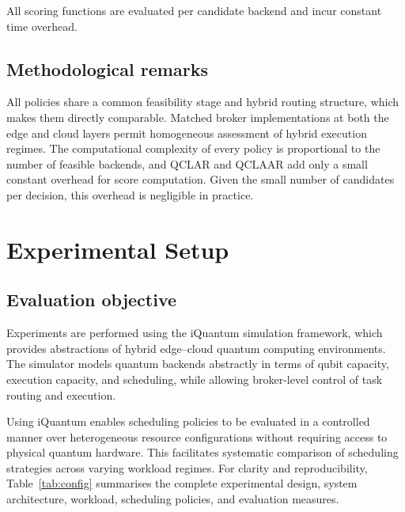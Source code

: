 \documentclass[preprint,12pt]{elsarticle}
\newcommand{\QCLAR}{\textsc{QCLAR}}
\newcommand{\QCLAAR}{\textsc{QCLAAR}}
\begin{document}
All scoring functions are evaluated per candidate backend and incur constant
time overhead.

\subsection{Methodological remarks}
All policies share a common feasibility stage and hybrid routing structure,
which makes them directly comparable. Matched broker implementations at both the
edge and cloud layers permit homogeneous assessment of hybrid execution regimes.
The computational complexity of every policy is proportional to the number of
feasible backends, and \QCLAR{} and \QCLAAR{} add only a small constant overhead
for score computation. Given the small number of candidates per decision, this
overhead is negligible in practice.

\section{Experimental Setup}
\label{sec:setup}

\subsection{Evaluation objective}
Experiments are performed using the iQuantum simulation framework, which
provides abstractions of hybrid edge--cloud quantum computing environments. The
simulator models quantum backends abstractly in terms of qubit capacity,
execution capacity, and scheduling, while allowing broker-level control of task
routing and execution.

Using iQuantum enables scheduling policies to be evaluated in a controlled
manner over heterogeneous resource configurations without requiring access to
physical quantum hardware. This facilitates systematic comparison of scheduling
strategies across varying workload regimes. For clarity and reproducibility,
Table~\ref{tab:config} summarises the complete experimental design, system
architecture, workload, scheduling policies, and evaluation measures.
\end{document}
